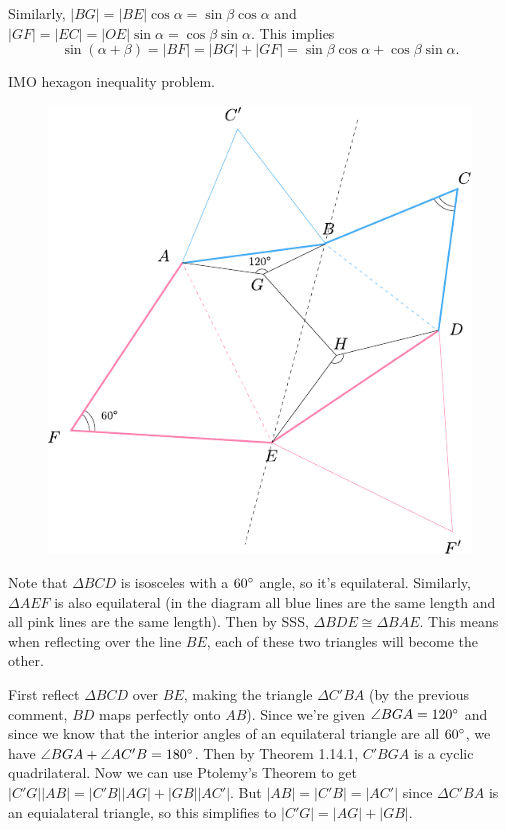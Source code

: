 \documentclass[twoside,10pt]{article}
\begin{document}
Similarly, $|BG|=|BE|\cos \alpha = \sin \beta \cos \alpha$ and $|GF|=|EC|=|OE|\sin \alpha = \cos \beta \sin \alpha$. This implies
\[
	\sin(\alpha+\beta) = |BF| = |BG|+|GF| = \sin \beta \cos \alpha + \cos \beta \sin \alpha.
\] 

\newpage

\begin{exer}[1.118]
IMO hexagon inequality problem.
\end{exer}

\begin{figure}[H]
	\centering
	\includegraphics[scale=1]{fig/118.pdf}
\end{figure}

Note that $\Delta BCD$ is isosceles with a $60 ^\circ$ angle, so it's equilateral. Similarly, $\Delta AEF$ is also equilateral (in the diagram all blue lines are the same length and all pink lines are the same length). Then by SSS, $\Delta BDE \cong \Delta BAE$. This means when reflecting over the line $BE$, each of these two triangles will become the other.

First reflect $\Delta BCD$ over $BE$, making the triangle $\Delta C'BA$ (by the previous comment, $BD$ maps perfectly onto $AB$). Since we're given $\angle BGA = 120^\circ$ and since we know that the interior angles of an equilateral triangle are all $60^\circ$, we have $\angle BGA + \angle AC'B = 180^\circ$. Then by Theorem 1.14.1, $C'BGA$ is a cyclic quadrilateral. Now we can use Ptolemy's Theorem to get $|C'G| |AB| = |C'B| |AG| + |GB| |AC'|$. But $|AB|=|C'B|=|AC'|$ since $\Delta C' BA$ is an equialateral triangle, so this simplifies to $|C'G| = |AG| + |GB|$.
\end{document}
